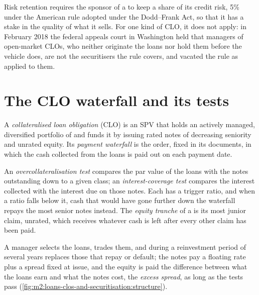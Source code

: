 Risk retention requires the sponsor of a  to keep a share of its credit
risk, 5\% under the American rule adopted under the Dodd--Frank Act, so that it has
a stake in the quality of what it sells. For one kind of CLO, it does not apply: in February 2018 the
federal appeals court in Washington held that managers of open-market CLOs, who
neither originate the loans nor hold them before the vehicle does, are not the
securitisers the rule covers, and vacated the rule as applied to them.

\section{The CLO waterfall and its tests}

\begin{definition}\label{def:m2:loans-clos-and-securitisation:clo}
A \emph{collateralised loan obligation} (CLO)
is an SPV that holds an actively managed, diversified portfolio of 
and funds it by issuing rated notes of decreasing seniority and unrated equity. Its
\emph{payment waterfall} is the order, fixed in its documents,
in which the cash collected from the loans is paid out on each payment date.
\end{definition}

\begin{definition}\label{def:m2:loans-clos-and-securitisation:tests}
An \emph{overcollateralisation test} compares the
par value of the loans with the notes outstanding down to a given class; an
\emph{interest-coverage test} compares the interest
collected with the interest due on those notes. Each has a trigger ratio, and when a
ratio falls below it, cash that would have gone further down the waterfall repays the
most senior notes instead. The \emph{equity tranche} of a
 is its most junior claim, unrated, which receives whatever cash is left
after every other claim has been paid.
\end{definition}

A manager selects the loans, trades them, and during a reinvestment period of several
years replaces those that repay or default; the notes pay a floating rate plus a
spread fixed at issue, and the equity is paid the difference between what the loans
earn and what the notes cost, the \emph{excess spread}, as long as the tests pass
(\cref{fig:m2:loans-clos-and-securitisation:structure}).

